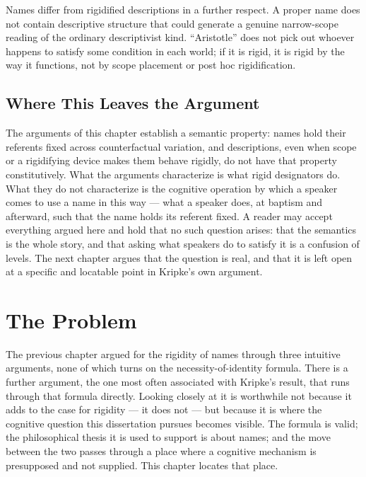 \documentclass[12pt,a4paper]{article}
\begin{document}
Names differ from rigidified descriptions in a further respect. A proper name does not contain descriptive structure that could generate a genuine narrow-scope reading of the ordinary descriptivist kind. ``Aristotle'' does not pick out whoever happens to satisfy some condition in each world; if it is rigid, it is rigid by the way it functions, not by scope placement or post hoc rigidification.

\subsection{Where This Leaves the Argument}\label{where-this-leaves-the-argument}

The arguments of this chapter establish a semantic property: names hold their referents fixed across counterfactual variation, and descriptions, even when scope or a rigidifying device makes them behave rigidly, do not have that property constitutively. What the arguments characterize is what rigid designators do. What they do not characterize is the cognitive operation by which a speaker comes to use a name in this way --- what a speaker does, at baptism and afterward, such that the name holds its referent fixed. A reader may accept everything argued here and hold that no such question arises: that the semantics is the whole story, and that asking what speakers do to satisfy it is a confusion of levels. The next chapter argues that the question is real, and that it is left open at a specific and locatable point in Kripke's own argument.

\section{The Problem}\label{the-problem}

The previous chapter argued for the rigidity of names through three intuitive arguments, none of which turns on the necessity-of-identity formula. There is a further argument, the one most often associated with Kripke's result, that runs through that formula directly. Looking closely at it is worthwhile not because it adds to the case for rigidity --- it does not --- but because it is where the cognitive question this dissertation pursues becomes visible. The formula is valid; the philosophical thesis it is used to support is about names; and the move between the two passes through a place where a cognitive mechanism is presupposed and not supplied. This chapter locates that place.
\end{document}
